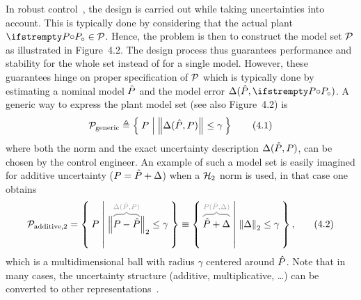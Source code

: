 \documentclass{responseletter}
\begin{document}
\begin{enumerate}
\begin{newquote}
In robust control~\citep{Zhou1996,Skogestad2005}, the design is carried out while taking uncertainties into account.
This is typically done by considering that the actual plant $\true{\Plant} \in \ModelSet[]$.
Hence, the problem is then to construct the model set $\ModelSet[]$ as illustrated in Figure~4.2.
The design process thus guarantees performance and stability for the whole set instead of for a single model.
However, these guarantees hinge on proper specification of $\ModelSet[]$ which is typically done by estimating a nominal model $\estimated{\Plant}$ and the model error $\Delta(\estimated{\Plant}, \true{\Plant})$.
A generic way to express the plant model set (see also Figure~4.2) is
\begin{equation}
  \ModelSet[]_{\mathrm{generic}} 
  \isdef 
  \Set{ \Plant | \norm{\Delta(\estimated{\Plant}, \Plant)} \leq \gamma}
  \label{eq:lrmhinf:model-set:generic}
  \tag{4.1}
\end{equation}
where both the norm and the exact uncertainty description $\Delta(\estimated{\Plant}, \Plant)$, can be chosen by the control engineer.
An example of such a model set is easily imagined for additive uncertainty ($\Plant = \estimated{\Plant} + \Delta$) when a $\Hardy_{2}$ norm is used, in that case one obtains
\begin{equation}
  \ModelSet[]_{\mathrm{additive,2}} 
  = 
  \Set{ \Plant | \Bignorm[2]{ \ezbrace{\Plant - \estimated{\Plant}}{\Delta(\estimated{\Plant}, \Plant)}  } \leq \gamma}
  \equiv
  \Set{  \ezbrace{\estimated{\Plant}  + \Delta}{\Plant(\estimated{\Plant}, \Delta)}  | \norm[2]{\Delta} \leq \gamma}
  \text{,}
  \tag{4.2}
\end{equation}
which is a multidimensional ball with radius $\gamma$ centered around $\estimated{\Plant}$.
Note that in many cases, the uncertainty structure (additive, multiplicative, \ldots) can be converted to other representations~\citep{Douma2005}.


\end{newquote}
\end{enumerate}
\end{document}
